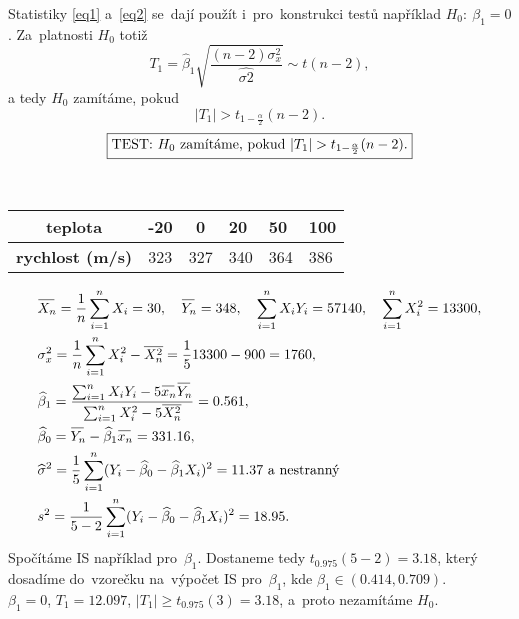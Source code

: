 Statistiky \eqref{eq1} a~\eqref{eq2} se~dají použít i~pro~konstrukci testů například $H_0: ~\beta_1=0$. Za~platnosti $H_0$ totiž
$$T_1=\widehat{\beta}_1\sqrt{\frac{(n-2)\sigma_x^2}{\widehat{\sigma2}}} \sim t(n-2),$$
a tedy $H_0$ zamítáme, pokud
$$|T_1|>t_{1-\frac{\alpha}{2}}(n-2).$$
$$ \test{|T_1|>t_{1-\frac{\alpha}{2}}(n-2)} $$
\begin{example}~\\
	
\begin{center}
\begin{tabular}{|l|l|l|l|l|l|}
\hline
\multicolumn{1}{|c|}{{ \textbf{teplota}}} & -20 & \multicolumn{1}{c|}{0} & 20  & 50  & 100 \\ \hline
\textbf{rychlost (m/s)}                                       & 323 & 327                    & 340 & 364 & 386 \\ \hline
\end{tabular}

\end{center}
\begin{align*}
&\Oxn=\frac{1}{n}\sum_{i=1}^{n}X_i=30,\quad\Oyn=348,\quad
\sum_{i=1}^{n}X_iY_i=57 140,\quad
\sum_{i=1}^{n}X_i^2=13 300,\\
&\sigma_x^2=\frac{1}{n}\sum_{i=1}^{n}X_i^2-\overline{X_n^2}=\frac{1}{5}13 300-900=1 760,\\
&\widehat{\beta}_1=\frac{\sum_{i=1}^{n}X_iY_i-5\oxnn\Oyn}{\sum_{i=1}^{n}X_i^2-5\overline{X_n^2}}=0.561,\\
&\widehat{\beta}_0=\Oyn-\widehat{\beta}_1\oxnn=331.16,\\
&\widehat{\sigma}^2=\frac{1}{5}\sum_{i=1}^{n}(Y_i-\widehat{\beta}_0-\widehat{\beta}_1X_i)^2=11.37\text{ a~nestranný }\\
& s^2=\frac{1}{5-2}\sum_{i=1}^{n}(Y_i-\widehat{\beta}_0-\widehat{\beta}_1X_i)^2=18.95.
\end{align*}
Spočítáme IS například pro~$\beta_1$. Dostaneme tedy $t_{0.975}(5-2)=3.18$, který dosadíme do~vzorečku na~výpočet IS pro~$\beta_1$, kde $\beta_1 \in (0.414,0.709)$.\\
 $\beta_1=0$, $
T_1=12.097$, $|T_1| \geq t_{0.975}(3)=3.18$, a~proto nezamítáme $H_0$.
\end{example}


